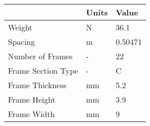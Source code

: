 \begin{tabular}{lll}
& Units & Value \\ 
\hline 
Weight & N & 36.1 \\ 
Spacing & m & 0.50471 \\ 
Number of Frames & - & 22 \\ 
Frame Section Type & - & C \\ 
Frame Thickness & mm & 5.2 \\ 
Frame Height & mm & 3.9 \\ 
Frame Width & mm & 9 \\ 
\hline 
\end{tabular}